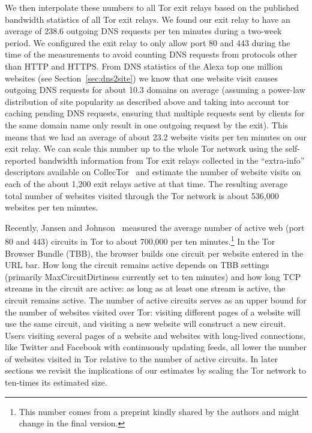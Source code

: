 We then interpolate these numbers to all Tor exit relays based on the published
bandwidth statistics of all Tor exit relays. We found our exit relay to have an
average of 238.6 outgoing DNS requests per ten minutes during a two-week period.
We configured the exit relay to only allow port 80 and 443 during the time
of the measurements to avoid counting DNS requests from protocols other than
HTTP and HTTPS. %
From DNS statistics of the Alexa top one million websites (see
Section~\ref{sec:dns2site}) we know that one website visit causes outgoing DNS requests for about 10.3 domains on average
(assuming a power-law distribution of site popularity as described above and
taking into account tor caching pending DNS requests, ensuring that multiple
requests sent by clients for the same domain name only result in one outgoing request
by the exit).
This means that we had an average of about 23.2 website visits per ten
minutes on our exit relay. We can scale this number up to the whole Tor
network using the self-reported bandwidth information from Tor exit
relays collected in the ``extra-info'' descriptors available on
CollecTor~\cite{collector} and estimate the number of website visits on
each of the about 1,200 exit relays active at that time. The resulting average
total number of websites visited through the Tor network is about 536,000
websites per ten minutes.

Recently, Jansen and Johnson~\cite{Jansen2016a} measured the average
number of active web (port 80 and 443) circuits in Tor to about 700,000 per ten
minutes.\footnote{This number comes from a preprint kindly
shared by the authors and might change in the final version.}
In the Tor Browser Bundle (TBB), the browser builds one circuit per
website entered in the URL bar. How long the circuit remains active depends on
TBB settings (primarily MaxCircuitDirtiness currently set to ten minutes) and how
long TCP streams in the circuit are active: as long as at least one stream is
active, the circuit remains active. The number of active circuits serves as an
upper bound for the number of websites visited over Tor: visiting different
pages of a website will use the same circuit, and visiting a new website will
construct a new circuit. Users visiting several pages of a website and websites
with long-lived connections, like Twitter and Facebook with continuously
updating feeds,
all lower the number of websites visited in Tor relative to the number of active
circuits. In later sections we revisit the implications of our estimates by
scaling the Tor network to ten-times its estimated size.

